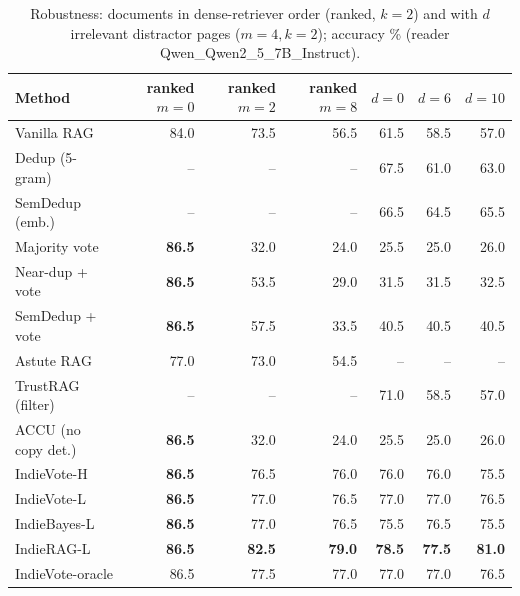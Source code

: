 \begin{table}[tbp]
\centering
\small
\caption{Robustness: documents in dense-retriever order (ranked, $k{=}2$) and with $d$ irrelevant distractor pages ($m{=}4,k{=}2$); accuracy \% (reader Qwen\_Qwen2\_5\_7B\_Instruct).}
\label{tab:robust}
\setlength{\tabcolsep}{4pt}
\begin{tabular}{lrrrrrr}
\toprule
Method & ranked $m{=}0$ & ranked $m{=}2$ & ranked $m{=}8$ & $d{=}0$ & $d{=}6$ & $d{=}10$ \\
\midrule
Vanilla RAG & 84.0 & 73.5 & 56.5 & 61.5 & 58.5 & 57.0 \\
Dedup (5-gram) & -- & -- & -- & 67.5 & 61.0 & 63.0 \\
SemDedup (emb.) & -- & -- & -- & 66.5 & 64.5 & 65.5 \\
Majority vote & \textbf{86.5} & 32.0 & 24.0 & 25.5 & 25.0 & 26.0 \\
Near-dup + vote & \textbf{86.5} & 53.5 & 29.0 & 31.5 & 31.5 & 32.5 \\
SemDedup + vote & \textbf{86.5} & 57.5 & 33.5 & 40.5 & 40.5 & 40.5 \\
Astute RAG & 77.0 & 73.0 & 54.5 & -- & -- & -- \\
TrustRAG (filter) & -- & -- & -- & 71.0 & 58.5 & 57.0 \\
ACCU (no copy det.) & \textbf{86.5} & 32.0 & 24.0 & 25.5 & 25.0 & 26.0 \\
IndieVote-H & \textbf{86.5} & 76.5 & 76.0 & 76.0 & 76.0 & 75.5 \\
IndieVote-L & \textbf{86.5} & 77.0 & 76.5 & 77.0 & 77.0 & 76.5 \\
IndieBayes-L & \textbf{86.5} & 77.0 & 76.5 & 75.5 & 76.5 & 75.5 \\
IndieRAG-L & \textbf{86.5} & \textbf{82.5} & \textbf{79.0} & \textbf{78.5} & \textbf{77.5} & \textbf{81.0} \\
IndieVote-oracle & 86.5 & 77.5 & 77.0 & 77.0 & 77.0 & 76.5 \\
\bottomrule
\end{tabular}
\end{table}
